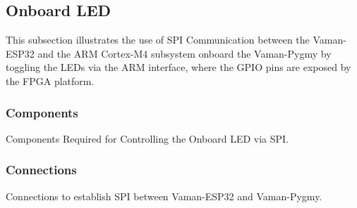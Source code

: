 \subsection{Onboard LED}
This subsection illustrates the use of SPI Communication between the Vaman-ESP32
and the ARM Cortex-M4 subsystem onboard the Vaman-Pygmy by toggling the LEDs via
the ARM interface, where the GPIO pins are exposed by the FPGA platform.

\subsubsection{Components}
\begin{table}[!ht]
    \centering
    
    \caption{Components Required for Controlling the Onboard LED via SPI.}
    \label{tab:esp32-m4-fpga-led-components}
\end{table}

\subsubsection{Connections}
\begin{table}[!ht]
    \centering
    
    \caption{Connections to establish SPI between Vaman-ESP32 and Vaman-Pygmy.}
    \label{tab:esp32-m4-fpga-led-connections}
\end{table}

